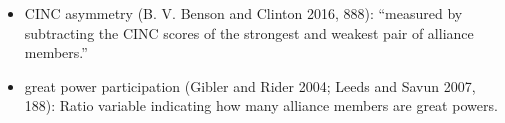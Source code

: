 \documentclass[
  letterpaper,
  DIV=11,
  numbers=noendperiod]{scrartcl}
\begin{document}
\begin{itemize}
  capabilities in the alliance are equally distributed) to 1 (when one
  state holds all of the capabilities in the alliance). In this formula,
  \(\sqrt{\sum_{i=1}^{n}(Si)^2-\frac{1}{n}/(1-\frac{1}{n})}\), \(Si\)
  denotes \(i\)'s share of the alliance's total capabilities, and \(n\)
  is the number of allies in the alliance.''
\item
  CINC asymmetry (B. V. Benson and Clinton 2016, 888): ``measured by
  subtracting the CINC scores of the strongest and weakest pair of
  alliance members.''
\item
  great power participation (Gibler and Rider 2004; Leeds and Savun
  2007, 188): Ratio variable indicating how many alliance members are
  great powers.
\end{itemize}

\begin{table}

\caption{\label{tbl-althierarchy}Coefficient estimates with alternate
variables for hierarchy.}

\centering{

}
\end{table}
\end{document}
